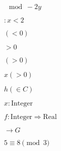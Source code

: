 \documentclass{article}
\begin{document}

$\mod -2y$

$:x<2$

$(<0)$ 

$>0$

$(>0)$

$x(>0)$

$h(\in C)$

$x : \mathrm{Integer}$

$f : \mathrm{Integer} \Rightarrow \mathrm{Real}$

$\rightarrow G$

$ 5\equiv 8 \pmod 3 $
\end{document}
